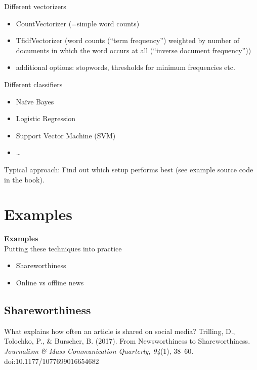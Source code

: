 \documentclass{beamer}
\begin{document}
	
		\begin{frame}{Different vectorizers}
			\begin{itemize}
				\item CountVectorizer (=simple word counts)
				\item TfidfVectorizer (word counts (``term frequency'') weighted by number of documents in which the word occurs at all (``inverse document frequency''))
				\item additional options: stopwords, thresholds for minimum frequencies etc.
			\end{itemize}
		\end{frame}
		
		\begin{frame}{Different classifiers}
			\begin{itemize}
				\item Naïve Bayes
				\item Logistic Regression
				\item Support Vector Machine (SVM)
				\item \ldots
			\end{itemize}
			Typical approach: Find out which setup performs best (see example source code in the book).
		\end{frame}
		
	
\section{Examples}
\begin{frame}
	\textbf{Examples} \\
	Putting these techniques into practice
	\vspace{1cm}
	\begin{itemize}
		\item Shareworthiness
		\item Online vs offline news
	\end{itemize}
\end{frame}



\subsection{Shareworthiness}

\begin{frame}{What explains how often an article is shared on social media?}
Trilling, D., Tolochko, P., \& Burscher, B. (2017). From Newsworthiness to Shareworthiness. \textit{Journalism \& Mass Communication Quarterly, 94}(1), 38–60. doi:10.1177/1077699016654682
\end{frame}
\end{document}
